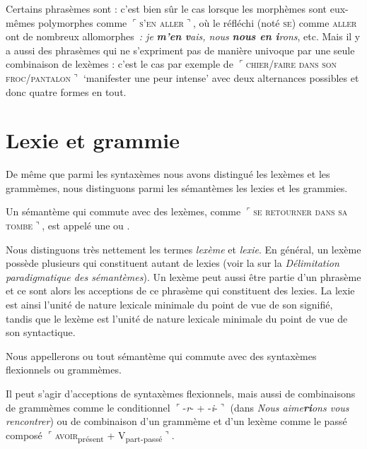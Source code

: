 Certains phrasèmes sont : c’est bien sûr le cas lorsque les morphèmes sont eux-mêmes polymorphes comme $⌜$\textsc{s’en} \textsc{aller}$⌝$, où le réfléchi (noté \textsc{se}) comme \textsc{aller} ont de nombreux allomorphes~\textit{: je} \textbf{\textit{m’en} \textit{v}}\textit{ais, nous} \textbf{\textit{nous en i}}\textit{rons}, etc. Mais il y a aussi des phrasèmes qui ne s’expriment pas de manière univoque par une seule combinaison de lexèmes : c’est le cas par exemple de $⌜$\textsc{chier/faire} \textsc{dans} \textsc{son} \textsc{froc/pantalon}$⌝$ ‘manifester une peur intense’ avec deux alternances possibles et donc quatre formes en tout.

\section{Lexie et grammie}\label{sec:2.3.8}%

De même que parmi les syntaxèmes nous avons distingué les lexèmes et les grammèmes, nous distinguons parmi les sémantèmes les lexies et les grammies.

{Un sémantème qui commute avec des lexèmes, comme $⌜$\textsc{se} \textsc{retourner} \textsc{dans} \textsc{sa} \textsc{tombe}$⌝$, est appelé une  ou .}

Nous distinguons très nettement les termes \textit{lexème} et \textit{lexie}. En général, un lexème possède plusieurs  qui constituent autant de lexies (voir la  sur la \textit{Délimitation paradigmatique des sémantèmes}). Un lexème peut aussi être partie d’un phrasème et ce sont alors les acceptions de ce phrasème qui constituent des lexies. La lexie est ainsi l’unité de nature lexicale minimale du point de vue de son signifié, tandis que le lexème est l’unité de nature lexicale minimale du point de vue de son syntactique.

{Nous appellerons  ou  tout sémantème qui commute avec des syntaxèmes flexionnels ou grammèmes.}

Il peut s’agir d’acceptions de syntaxèmes flexionnels, mais aussi de combinaisons de grammèmes comme le conditionnel  $⌜${}-\textit{r}{}- + -\textit{i}{}-$⌝$ (dans \textit{Nous aime}\textbf{\textit{ri}}\textit{ons vous rencontrer}) ou de combinaison d’un grammème et d’un lexème comme le passé composé $⌜$\textsc{avoir}\textsubscript{présent} + V\textsubscript{part-passé}$⌝$.

